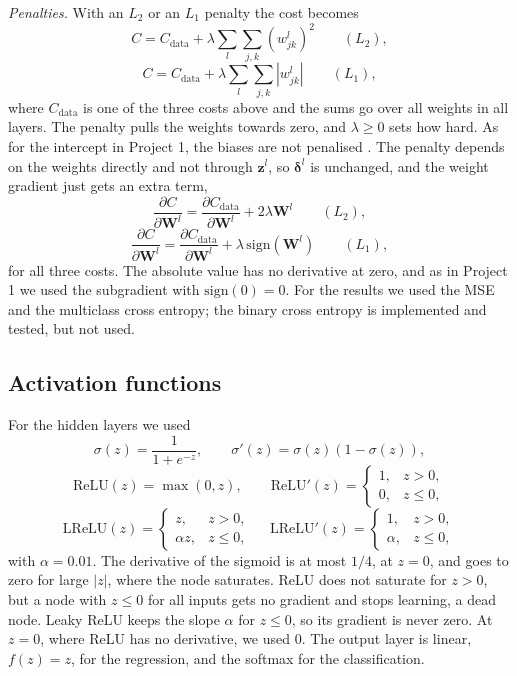 \emph{Penalties.} With an $L_2$ or an $L_1$ penalty the cost becomes
$$
C = C_{\mathrm{data}} + \lambda\sum_{l}\sum_{j,k}\left(w^l_{jk}\right)^2 \qquad (L_2),
$$
$$
C = C_{\mathrm{data}} + \lambda\sum_{l}\sum_{j,k}\left|w^l_{jk}\right| \qquad (L_1),
$$
where $C_{\mathrm{data}}$ is one of the three costs above and the sums go over all weights in all layers. The penalty pulls the weights towards zero, and $\lambda \ge 0$ sets how hard. As for the intercept in Project 1, the biases are not penalised \cite[Sec.~8.12]{HjorthJensen2026}. The penalty depends on the weights directly and not through $\mathbf{z}^l$, so $\boldsymbol{\delta}^l$ is unchanged, and the weight gradient just gets an extra term,
$$
\frac{\partial C}{\partial \mathbf{W}^l} = \frac{\partial C_{\mathrm{data}}}{\partial \mathbf{W}^l} + 2\lambda\mathbf{W}^l \qquad (L_2),
$$
$$
\frac{\partial C}{\partial \mathbf{W}^l} = \frac{\partial C_{\mathrm{data}}}{\partial \mathbf{W}^l} + \lambda\,\mathrm{sign}(\mathbf{W}^l) \qquad (L_1),
$$
for all three costs. The absolute value has no derivative at zero, and as in Project 1 we used the subgradient with $\mathrm{sign}(0) = 0$. For the results we used the MSE and the multiclass cross entropy; the binary cross entropy is implemented and tested, but not used.

\subsection*{Activation functions}

For the hidden layers we used \cite[Sec.~8.6]{HjorthJensen2026}
$$
\sigma(z) = \frac{1}{1 + e^{-z}}, \qquad \sigma'(z) = \sigma(z)\left(1 - \sigma(z)\right),
$$
$$
\mathrm{ReLU}(z) = \max(0, z), \qquad \mathrm{ReLU}'(z) = \begin{cases} 1, & z > 0, \\ 0, & z \le 0, \end{cases}
$$
$$
\mathrm{LReLU}(z) = \begin{cases} z, & z > 0, \\ \alpha z, & z \le 0, \end{cases} \quad\; \mathrm{LReLU}'(z) = \begin{cases} 1, & z > 0, \\ \alpha, & z \le 0, \end{cases}
$$
with $\alpha = 0.01$. The derivative of the sigmoid is at most $1/4$, at $z = 0$, and goes to zero for large $|z|$, where the node saturates. ReLU does not saturate for $z > 0$, but a node with $z \le 0$ for all inputs gets no gradient and stops learning, a dead node. Leaky ReLU keeps the slope $\alpha$ for $z \le 0$, so its gradient is never zero. At $z = 0$, where ReLU has no derivative, we used 0. The output layer is linear, $f(z) = z$, for the regression, and the softmax for the classification.

